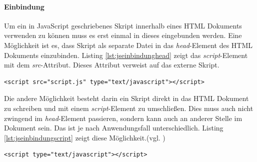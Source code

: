 \documentclass[12pt,a4paper,bibliography=totocnumbered,listof=totocnumbered]{scrartcl}
\begin{document}
\paragraph{Einbindung} Um ein in JavaScript geschriebenes Skript innerhalb eines HTML Dokuments verwenden zu können muss es erst einmal in dieses eingebunden werden. Eine Möglichkeit ist es, dass Skript als separate Datei in das \textit{head}-Element des HTML Dokuments einzubinden. Listing \ref{lst:jseinbindunghead} zeigt das \textit{script}-Element mit dem \textit{src}-Attribut. Dieses Attribut verweist auf das externe Skript.

	\vspace{1em}
	\begin{lstlisting}[caption=JavaScript Einbindung als separate Datei im \textit{head}-Element, label=lst:jseinbindunghead]
<script src="script.js" type="text/javascript"></script>
	\end{lstlisting}

Die andere Möglichkeit besteht darin ein Skript direkt in das HTML Dokument zu schreiben und mit einem \textit{script}-Element zu umschließen. Dies muss auch nicht zwingend im \textit{head}-Element passieren, sondern kann auch an anderer Stelle im Dokument sein. Das ist je nach Anwendungsfall unterschiedlich. Listing \ref{lst:jseinbindungscript} zeigt diese Möglichkeit.(vgl. \cite[S.]{})

	\vspace{1em}
	\begin{lstlisting}[caption=JavaScript Einbindung in \textit{script}-Element, label=lst:jseinbindungscript]
<script type="text/javascript"></script>
	\end{lstlisting}
\end{document}
